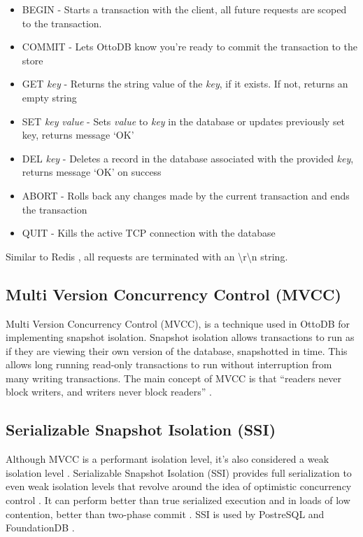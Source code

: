 \documentclass[conference]{IEEEtran}
\begin{document}
    \begin{itemize}
        \item BEGIN - Starts a transaction with the client, all future requests are scoped to the transaction.
        \item COMMIT - Lets OttoDB know you’re ready to commit the transaction to the store
        \item GET \textit{key} - Returns the string value of the \textit{key}, if it exists. If not, returns an empty string
        \item SET \textit{key} \textit{value} - Sets \textit{value} to \textit{key} in the database or updates previously set key, returns message ‘OK’
        \item DEL \textit{key} - Deletes a record in the database associated with the provided \textit{key}, returns message ‘OK’ on success
        \item ABORT - Rolls back any changes made by the current transaction and ends the transaction
        \item QUIT - Kills the active TCP connection with the database
    \end{itemize}

    Similar to Redis \cite{b1}, all requests are terminated with an {\textbackslash}r{\textbackslash}n string. 

    \subsection{Multi Version Concurrency Control (MVCC)}

    Multi Version Concurrency Control (MVCC), is a technique used in OttoDB for implementing snapshot isolation. Snapshot isolation allows transactions to run as if they are viewing their own version of the database, snapshotted in time. This allows long running read-only transactions to run without interruption from many writing transactions. The main concept of MVCC is that “readers never block writers, and writers never block readers” \cite[p. 239]{b18}. 

    \subsection{Serializable Snapshot Isolation (SSI)}

    Although MVCC is a performant isolation level, it’s also considered a weak isolation level \cite[p. 261]{b18}. Serializable Snapshot Isolation (SSI) provides full serialization to even weak isolation levels that revolve around the idea of optimistic concurrency control \cite[p. 261]{b18}. It can perform better than true serialized execution and in loads of low contention, better than two-phase commit \cite[p. 265]{b18}. SSI is used by PostreSQL and FoundationDB \cite[p. 261]{b18}. 
\end{document}
